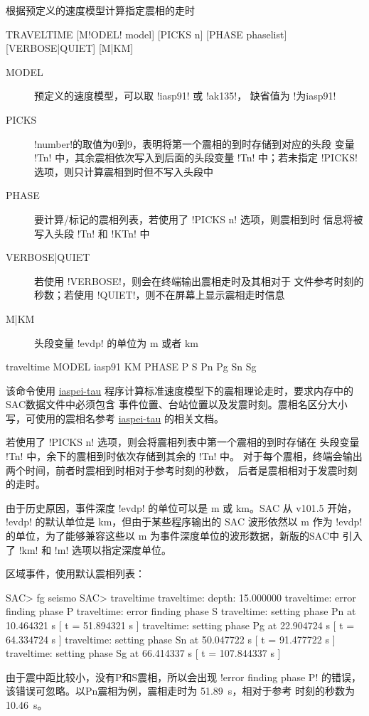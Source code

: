 \label{cmd:traveltime}

根据预定义的速度模型计算指定震相的走时

\begin{SACSTX}
TRAVELTIME [M!ODEL! model] [PICKS n] [PHASE phaselist] [VERBOSE|QUIET] [M|KM]
\end{SACSTX}

\begin{description}
\item [MODEL] 预定义的速度模型，可以取 !iasp91! 或 !ak135!，
    缺省值为 !为iasp91!
\item [PICKS] !number!的取值为0到9，表明将第一个震相的到时存储到对应的头段
    变量 !Tn! 中，其余震相依次写入到后面的头段变量 !Tn! 中；若未指定
    !PICKS!选项，则只计算震相到时但不写入头段中
\item [PHASE] 要计算/标记的震相列表，若使用了 !PICKS n! 选项，则震相到时
    信息将被写入头段 !Tn! 和 !KTn! 中
\item [VERBOSE|QUIET] 若使用 !VERBOSE!，则会在终端输出震相走时及其相对于
    文件参考时刻的秒数；若使用 !QUIET!，则不在屏幕上显示震相走时信息
\item [M|KM] 头段变量 !evdp! 的单位为 \si{\m} 或者 \si{\km}
\end{description}

\begin{SACDFT}
traveltime MODEL iasp91 KM PHASE P S Pn Pg Sn Sg
\end{SACDFT}

该命令使用 \href{https://seiscode.iris.washington.edu/projects/iaspei-tau}{iaspei-tau}
程序计算标准速度模型下的震相理论走时，要求内存中的SAC数据文件中必须包含
事件位置、台站位置以及发震时刻。震相名区分大小写，可使用的震相名参考
\href{https://seiscode.iris.washington.edu/projects/iaspei-tau}{iaspei-tau}
的相关文档。

若使用了 !PICKS n! 选项，则会将震相列表中第一个震相的到时存储在
头段变量 !Tn! 中，余下的震相到时依次存储到其余的 !Tn! 中。
对于每个震相，终端会输出两个时间，前者时震相到时相对于参考时刻的秒数，
后者是震相相对于发震时刻的走时。

由于历史原因，事件深度 !evdp! 的单位可以是 \si{\m} 或 \si{\km}。SAC 从 v101.5 开始，
!evdp! 的默认单位是 \si{\km}，但由于某些程序输出的 SAC 波形依然以 \si{\m} 作为
!evdp! 的单位，为了能够兼容这些以 \si{\m} 为事件深度单位的波形数据，新版的SAC中
引入了 !km! 和 !m! 选项以指定深度单位。

区域事件，使用默认震相列表：
\begin{SACCode}
SAC> fg seismo
SAC> traveltime
traveltime: depth: 15.000000
traveltime: error finding phase P
traveltime: error finding phase S
traveltime: setting phase Pn       at 10.464321 s [ t = 51.894321 s ]
traveltime: setting phase Pg       at 22.904724 s [ t = 64.334724 s ]
traveltime: setting phase Sn       at 50.047722 s [ t = 91.477722 s ]
traveltime: setting phase Sg       at 66.414337 s [ t = 107.844337 s ]
\end{SACCode}
由于震中距比较小，没有P和S震相，所以会出现 !error finding phase P!
的错误，该错误可忽略。以Pn震相为例，震相走时为 \SI{51.89}{\s}，相对于参考
时刻的秒数为 \SI{10.46}{\s}。

